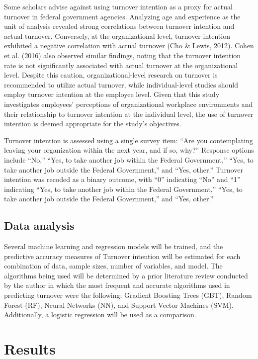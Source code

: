 \documentclass[
  man]{apa7}
\begin{document}
Some scholars advise against using turnover intention as a proxy for actual turnover in federal government agencies.
Analyzing age and experience as the unit of analysis revealed strong correlations between turnover intention and actual turnover.
Conversely, at the organizational level, turnover intention exhibited a negative correlation with actual turnover (Cho \& Lewis, 2012).
Cohen et al. (2016) also observed similar findings, noting that the turnover intention rate is not significantly associated with actual turnover at the organizational level.
Despite this caution, organizational-level research on turnover is recommended to utilize actual turnover, while individual-level studies should employ turnover intention at the employee level.
Given that this study investigates employees' perceptions of organizational workplace environments and their relationship to turnover intention at the individual level, the use of turnover intention is deemed appropriate for the study's objectives.

Turnover intention is assessed using a single survey item: ``Are you contemplating leaving your organization within the next year, and if so, why?'' Response options include ``No,'' ``Yes, to take another job within the Federal Government,'' ``Yes, to take another job outside the Federal Government,'' and ``Yes, other.'' Turnover intention was recoded as a binary outcome, with ``0'' indicating ``No'' and ``1'' indicating ``Yes, to take another job within the Federal Government,'' ``Yes, to take another job outside the Federal Government,'' and ``Yes, other.''

\hypertarget{data-analysis}{%
\subsection{Data analysis}\label{data-analysis}}

Several machine learning and regression models will be trained, and the predictive accuracy measures of Turnover intention will be estimated for each combination of data, sample sizes, number of variables, and model.
The algorithms being used will be determined by a prior literature review conducted by the author in which the most frequent and accurate algorithms used in predicting turnover were the following: Gradient Boosting Trees (GBT), Random Forest (RF), Neural Networks (NN), and Support Vector Machines (SVM).
Additionally, a logistic regression will be used as a comparison.

\hypertarget{results}{%
\section{Results}\label{results}}
\end{document}
